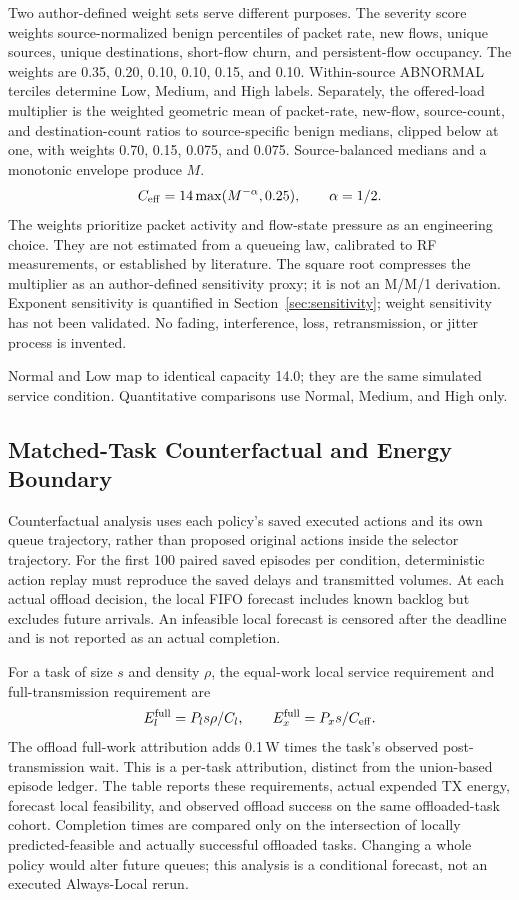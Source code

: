 \documentclass[conference]{IEEEtran}
\begin{document}
Two author-defined weight sets serve different purposes. The severity score weights source-normalized benign percentiles of packet rate, new flows, unique sources, unique destinations, short-flow churn, and persistent-flow occupancy. The weights are 0.35, 0.20, 0.10, 0.10, 0.15, and 0.10. Within-source ABNORMAL terciles determine Low, Medium, and High labels. Separately, the offered-load multiplier is the weighted geometric mean of packet-rate, new-flow, source-count, and destination-count ratios to source-specific benign medians, clipped below at one, with weights 0.70, 0.15, 0.075, and 0.075. Source-balanced medians and a monotonic envelope produce $M$.
\begin{equation}
C_{\rm eff}=14\max(M^{-\alpha},0.25),\qquad \alpha=1/2.
\label{eq:capacity}
\end{equation}
The weights prioritize packet activity and flow-state pressure as an engineering choice. They are not estimated from a queueing law, calibrated to RF measurements, or established by literature. The square root compresses the multiplier as an author-defined sensitivity proxy; it is not an M/M/1 derivation. Exponent sensitivity is quantified in Section~\ref{sec:sensitivity}; weight sensitivity has not been validated. No fading, interference, loss, retransmission, or jitter process is invented.

Normal and Low map to identical capacity 14.0; they are the same simulated service condition. Quantitative comparisons use Normal, Medium, and High only.

\subsection{Matched-Task Counterfactual and Energy Boundary}
\label{sec:matched}
Counterfactual analysis uses each policy's saved executed actions and its own queue trajectory, rather than proposed original actions inside the selector trajectory. For the first 100 paired saved episodes per condition, deterministic action replay must reproduce the saved delays and transmitted volumes. At each actual offload decision, the local FIFO forecast includes known backlog but excludes future arrivals. An infeasible local forecast is censored after the deadline and is not reported as an actual completion.

For a task of size $s$ and density $\rho$, the equal-work local service requirement and full-transmission requirement are
\begin{equation}
E_l^{\rm full}=P_l s\rho/C_l,\qquad E_x^{\rm full}=P_x s/C_{\rm eff}.
\label{eq:matched}
\end{equation}
The offload full-work attribution adds 0.1\,W times the task's observed post-transmission wait. This is a per-task attribution, distinct from the union-based episode ledger. The table reports these requirements, actual expended TX energy, forecast local feasibility, and observed offload success on the same offloaded-task cohort. Completion times are compared only on the intersection of locally predicted-feasible and actually successful offloaded tasks. Changing a whole policy would alter future queues; this analysis is a conditional forecast, not an executed Always-Local rerun.
\end{document}
